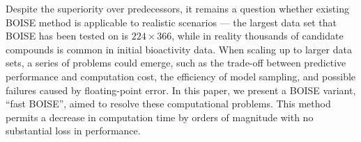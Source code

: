 \documentclass[11pt,a4paper]{article}
\theoremstyle{plain}
\begin{document}
Despite the superiority over predecessors, it remains a question whether existing BOISE method is applicable to realistic scenarios --- the largest data set that BOISE has been tested on is $224 \times 366$, while in reality thousands of candidate compounds is common in initial bioactivity data. 
When scaling up to larger data sets, a series of problems could emerge, such as the trade-off between predictive performance and computation cost, the efficiency of model sampling, and possible failures caused by floating-point error. 
In this paper, we present a BOISE variant, ``fast BOISE'', aimed to resolve these computational problems.
This method permits a decrease in computation time by orders of magnitude with no substantial loss in performance.
\end{document}
